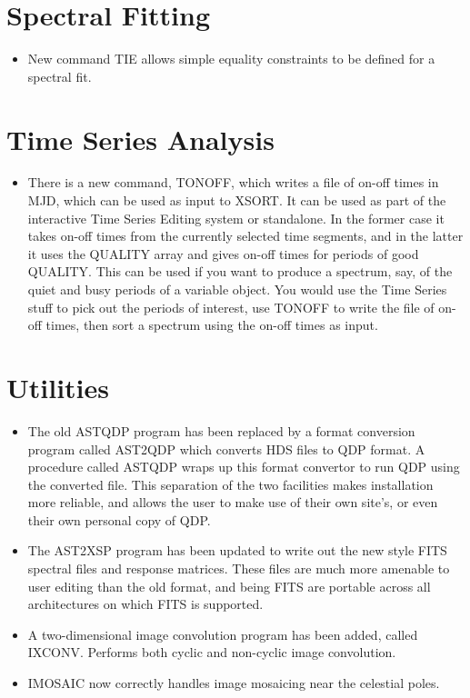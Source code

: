\documentclass{book}
\renewcommand{\_}{{\tt\char'137}}     %
\begin{document}
\section{Spectral Fitting}
\begin{itemize}
\item New command TIE allows simple equality constraints to be defined
for a spectral fit.
\end{itemize}
\section{Time Series Analysis}
\begin{itemize}
\item There is a new command, TONOFF, which writes a file of on-off times
in MJD, which can be used as input to XSORT. It can be used as part
of the interactive Time Series Editing system or standalone. In the
former case it takes on-off times from the currently selected time
segments, and in the latter it uses the QUALITY array and gives
on-off times for periods of good QUALITY. This can be used if you
want to produce a spectrum, say, of the quiet and busy periods of
a variable object. You would use the Time Series stuff to pick out
the periods of interest, use TONOFF to write the file of on-off times,
then sort a spectrum using the on-off times as input.
\end{itemize}
\section{Utilities}
\begin{itemize}
\item The old ASTQDP program has been replaced by a format conversion
program called AST2QDP which converts HDS files to QDP format.
A procedure called ASTQDP wraps up this format convertor to run
QDP using the converted file. This separation of the two facilities
makes installation more reliable, and allows the user to make
use of their own site's, or even their own personal copy of QDP.
\item The AST2XSP program has been updated to write out the new style
FITS spectral files and response matrices. These files are much
more amenable to user editing than the old format, and being FITS
are portable across all architectures on which FITS is supported.
\item A two-dimensional image convolution program has been added, called
IXCONV. Performs both cyclic and non-cyclic image convolution.
\item IMOSAIC now correctly handles image mosaicing near the celestial
poles.
\end{itemize}
\end{document}
